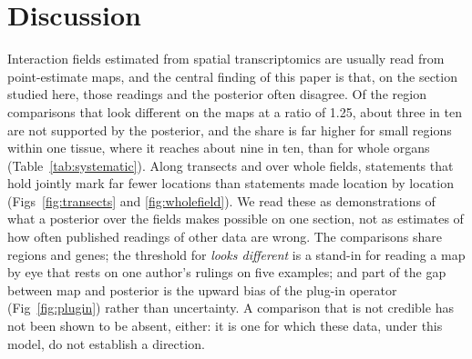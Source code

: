 \documentclass[10pt,letterpaper]{article}
\begin{document}
\section*{Discussion}\label{sec:discussion}

Interaction fields estimated from spatial transcriptomics are usually read from point-estimate maps, and the central finding of this paper is that, on the section studied here, those readings and the posterior often disagree. Of the region comparisons that look different on the maps at a ratio of 1.25, about three in ten are not supported by the posterior, and the share is far higher for small regions within one tissue, where it reaches about nine in ten, than for whole organs (Table~\ref{tab:systematic}). Along transects and over whole fields, statements that hold jointly mark far fewer locations than statements made location by location (Figs~\ref{fig:transects} and \ref{fig:wholefield}). We read these as demonstrations of what a posterior over the fields makes possible on one section, not as estimates of how often published readings of other data are wrong. The comparisons share regions and genes; the threshold for \textit{looks different} is a stand-in for reading a map by eye that rests on one author's rulings on five examples; and part of the gap between map and posterior is the upward bias of the plug-in operator (Fig~\ref{fig:plugin}) rather than uncertainty. A comparison that is not credible has not been shown to be absent, either: it is one for which these data, under this model, do not establish a direction.
\end{document}
